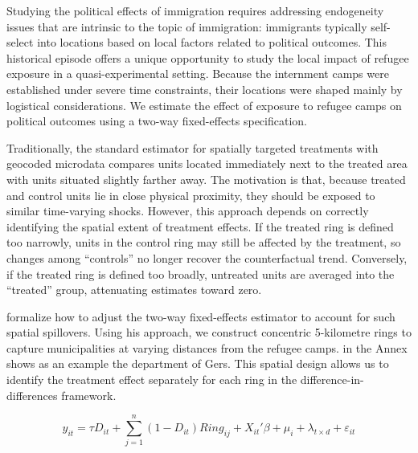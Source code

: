 

Studying the political effects of immigration requires addressing endogeneity issues that are intrinsic to the topic of immigration: immigrants typically self-select into locations based on local factors related to political outcomes. This historical episode offers a unique opportunity to study the local impact of refugee exposure in a quasi-experimental setting. Because the internment camps were established under severe time constraints, their locations were shaped mainly by logistical considerations. We estimate the effect of exposure to refugee camps on political outcomes using a two-way fixed-effects specification. 

Traditionally, the standard estimator for spatially targeted treatments with geocoded microdata compares units located immediately next to the treated area with units situated slightly farther away. The motivation is that, because treated and control units lie in close physical proximity, they should be exposed to similar time-varying shocks. However, this approach depends on correctly identifying the spatial extent of treatment effects. If the treated ring is defined too narrowly, units in the control ring may still be affected by the treatment, so changes among “controls” no longer recover the counterfactual trend. Conversely, if the treated ring is defined too broadly, untreated units are averaged into the “treated” group, attenuating estimates toward zero. 

\citet{butts_difference--differences_2023} formalize how to adjust the two-way fixed-effects estimator to account for such spatial spillovers. Using his approach, we construct concentric 5-kilometre rings to capture municipalities at varying distances from the refugee camps.  in the Annex shows as an example the department of Gers. This spatial design allows us to identify the treatment effect separately for each ring in the difference-in-differences framework.

\begin{equation}\label{equation:political}
y_{it} = \tau D_{it}
+ \sum_{j=1}^{n} (1 - D_{it}) Ring_{ij}
+ X_{it}'\beta
+ \mu_i + \lambda_{t \times d} + \varepsilon_{it}
\end{equation}


